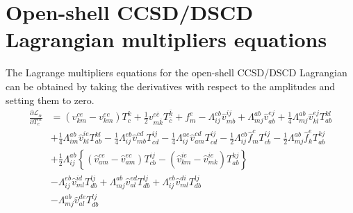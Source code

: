 \documentclass[a4paper,12pt,oneside]{book}
\newcommand{\spa}[1]{{#1}}
\newcommand{\spb}[1]{\bar{#1}}
\newcommand{\half}{\frac{1}{2}}
\newcommand{\quart}{\frac{1}{4}}
\begin{document}
\section{Open-shell CCSD/DSCD Lagrangian multipliers equations}
The Lagrange multipliers equations for the open-shell CCSD/DSCD Lagrangian can be obtained by
taking the derivatives with respect to the amplitudes and setting them to zero.
\begin{equation}
\begin{aligned}
\frac{\partial\mathcal{L}_{\alpha}}{\partial T^{\spa{m}}_{\spa{e}}}&=
\left(v_{\spa{k}\spa{m}}^{\spa{c}\spa{e}} - v_{\spa{k}\spa{m}}^{\spa{e}\spa{c}}\right) T^{\spa{k}}_{\spa{c}} 
+ \half v_{\spa{m}\spb{k}}^{\spa{e}\spb{c}}T^{\spb{k}}_{\spb{c}} +  f_{\spa{m}}^{\spa{e}}
- Λ_{\spa{i}\spa{j}}^{\spa{e}\spa{b}} \hat v_{\spa{m}\spa{b}}^{\spa{i}\spa{j}}
+ Λ_{\spa{m}\spa{j}}^{\spa{a}\spa{b}} \hat v_{\spa{a}\spa{b}}^{\spa{e}\spa{j}}
+ \quart Λ_{\spa{m}\spa{j}}^{\spa{a}\spa{b}} \hat v_{\spa{k}\spa{l}}^{\spa{e}\spa{j}} T^{\spa{k}\spa{l}}_{\spa{a}\spa{b}}\\
&+ \quart Λ_{\spa{i}\spa{m}}^{\spa{a}\spa{b}} \hat v_{\spa{k}\spa{l}}^{\spa{i}\spa{e}} T^{\spa{k}\spa{l}}_{\spa{a}\spa{b}}
- \quart Λ_{\spa{i}\spa{j}}^{\spa{e}\spa{b}} \hat v_{\spa{m}\spa{b}}^{\spa{c}\spa{d}} T^{\spa{i}\spa{j}}_{\spa{c}\spa{d}}
- \quart Λ_{\spa{i}\spa{j}}^{\spa{a}\spa{e}} \hat v_{\spa{a}\spa{m}}^{\spa{c}\spa{d}} T^{\spa{i}\spa{j}}_{\spa{c}\spa{d}}
- \half Λ_{\spa{i}\spa{j}}^{\spa{e}\spa{b}} \hat f_{\spa{m}}^{\spa{c}} T^{\spa{i}\spa{j}}_{\spa{c}\spa{b}}
- \half Λ_{\spa{m}\spa{j}}^{\spa{a}\spa{b}} \hat f_{\spa{k}}^{\spa{e}} T^{\spa{k}\spa{j}}_{\spa{a}\spa{b}} \\
&+ \half Λ_{\spa{i}\spa{j}}^{\spa{a}\spa{b}} \left\{
  \left(\hat v_{\spa{a}\spa{m}}^{\spa{c}\spa{e}}-\hat v_{\spa{a}\spa{m}}^{\spa{e}\spa{c}}\right) T^{\spa{i}\spa{j}}_{\spa{c}\spa{b}}
-  \left(\hat v_{\spa{k}\spa{m}}^{\spa{i}\spa{e}}-\hat v_{\spa{m}\spa{k}}^{\spa{i}\spa{e}}\right) T^{\spa{k}\spa{j}}_{\spa{a}\spa{b}}\right\}\\
&- Λ_{\spa{i}\spa{j}}^{\spa{e}\spa{b}} 
 \hat v_{\spa{m}\spa{l}}^{\spa{i}\spa{d}} T^{\spa{l}\spa{j}}_{\spa{d}\spa{b}}
+ Λ_{\spa{m}\spa{j}}^{\spa{a}\spa{b}} 
 \hat v_{\spa{a}\spa{l}}^{\spa{e}\spa{d}} T^{\spa{l}\spa{j}}_{\spa{d}\spa{b}}
+ Λ_{\spa{i}\spa{j}}^{\spa{e}\spa{b}} 
 \hat v_{\spa{m}\spa{l}}^{\spa{d}\spa{i}}T^{\spa{l}\spa{j}}_{\spa{d}\spa{b}}\\
&- Λ_{\spa{m}\spa{j}}^{\spa{a}\spa{b}} 
 \hat v_{\spa{a}\spa{l}}^{\spa{d}\spa{e}}T^{\spa{l}\spa{j}}_{\spa{d}\spa{b}}

\end{aligned}
\end{equation}
\end{document}
